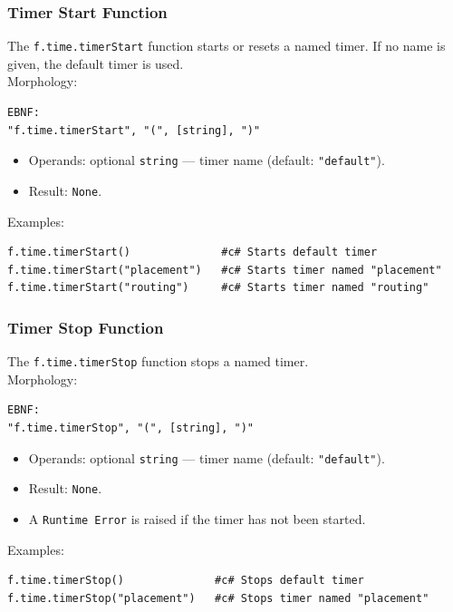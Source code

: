 \subsubsection{Timer Start Function}
The \texttt{f.time.timerStart} function starts or resets a named timer. If no name is given, the default timer is used. \\
Morphology:
\begin{verbatim}
EBNF:
"f.time.timerStart", "(", [string], ")"
\end{verbatim}
\begin{itemize}
\item Operands: optional \texttt{string} --- timer name (default: \texttt{"default"}).
\item Result: \texttt{None}.
\end{itemize}
Examples:
\begin{verbatim}
f.time.timerStart()              #c# Starts default timer
f.time.timerStart("placement")   #c# Starts timer named "placement"
f.time.timerStart("routing")     #c# Starts timer named "routing"
\end{verbatim}

\subsubsection{Timer Stop Function}
The \texttt{f.time.timerStop} function stops a named timer. \\
Morphology:
\begin{verbatim}
EBNF:
"f.time.timerStop", "(", [string], ")"
\end{verbatim}
\begin{itemize}
\item Operands: optional \texttt{string} --- timer name (default: \texttt{"default"}).
\item Result: \texttt{None}.
\item A \texttt{Runtime Error} is raised if the timer has not been started.
\end{itemize}
Examples:
\begin{verbatim}
f.time.timerStop()              #c# Stops default timer
f.time.timerStop("placement")   #c# Stops timer named "placement"
\end{verbatim}


